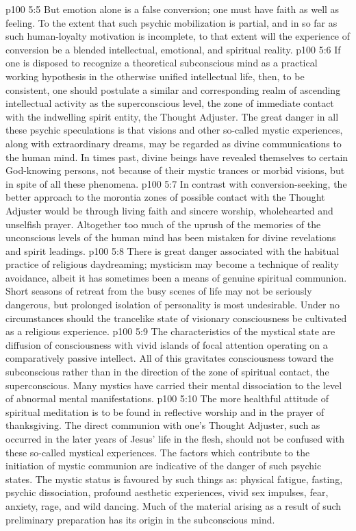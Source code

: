 \vs p100 5:5 But emotion alone is a false conversion; one must have faith as well as feeling. To the extent that such psychic mobilization is partial, and in so far as such human\hyp{}loyalty motivation is incomplete, to that extent will the experience of conversion be a blended intellectual, emotional, and spiritual reality.
\vs p100 5:6 \pc If one is disposed to recognize a theoretical subconscious mind as a practical working hypothesis in the otherwise unified intellectual life, then, to be consistent, one should postulate a similar and corresponding realm of ascending intellectual activity as the superconscious level, the zone of immediate contact with the indwelling spirit entity, the Thought Adjuster. The great danger in all these psychic speculations is that visions and other so\hyp{}called mystic experiences, along with extraordinary dreams, may be regarded as divine communications to the human mind. In times past, divine beings have revealed themselves to certain God\hyp{}knowing persons, not because of their mystic trances or morbid visions, but in spite of all these phenomena.
\vs p100 5:7 \pc In contrast with conversion\hyp{}seeking, the better approach to the morontia zones of possible contact with the Thought Adjuster would be through living faith and sincere worship, wholehearted and unselfish prayer. Altogether too much of the uprush of the memories of the unconscious levels of the human mind has been mistaken for divine revelations and spirit leadings.
\vs p100 5:8 There is great danger associated with the habitual practice of religious daydreaming; mysticism may become a technique of reality avoidance, albeit it has sometimes been a means of genuine spiritual communion. Short seasons of retreat from the busy scenes of life may not be seriously dangerous, but prolonged isolation of personality is most undesirable. Under no circumstances should the trancelike state of visionary consciousness be cultivated as a religious experience.
\vs p100 5:9 The characteristics of the mystical state are diffusion of consciousness with vivid islands of focal attention operating on a comparatively passive intellect. All of this gravitates consciousness toward the subconscious rather than in the direction of the zone of spiritual contact, the superconscious. Many mystics have carried their mental dissociation to the level of abnormal mental manifestations.
\vs p100 5:10 The more healthful attitude of spiritual meditation is to be found in reflective worship and in the prayer of thanksgiving. The direct communion with one’s Thought Adjuster, such as occurred in the later years of Jesus’ life in the flesh, should not be confused with these so\hyp{}called mystical experiences. The factors which contribute to the initiation of mystic communion are indicative of the danger of such psychic states. The mystic status is favoured by such things as: physical fatigue, fasting, psychic dissociation, profound aesthetic experiences, vivid sex impulses, fear, anxiety, rage, and wild dancing. Much of the material arising as a result of such preliminary preparation has its origin in the subconscious mind.
